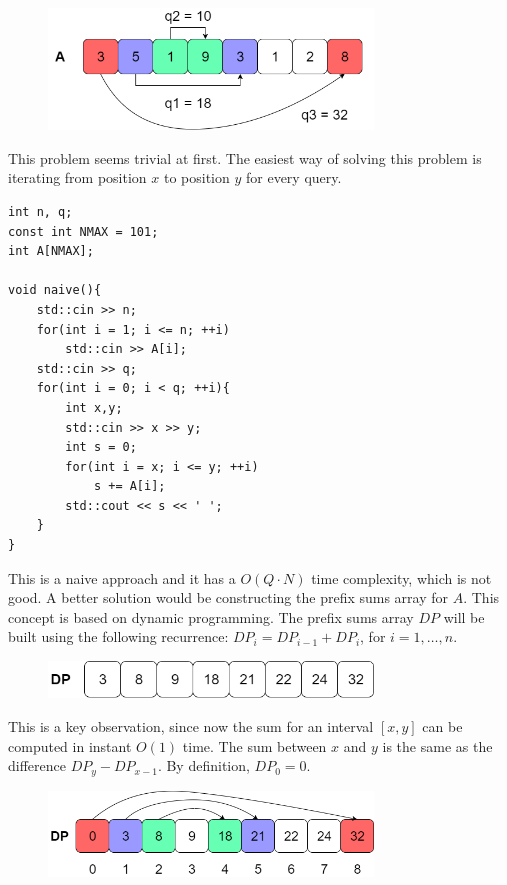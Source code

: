 \documentclass[letterpaper]{article}
\begin{document}
\begin{figure} [h!]
\centering
\includegraphics[width=0.77\textwidth]{pngOfDiagrams/prefixsum1.png}
\end{figure}

This problem seems trivial at first. The easiest way of solving this problem is iterating from position $x$ to position $y$ for every query.

\begin{lstlisting}
int n, q;
const int NMAX = 101;
int A[NMAX];

void naive(){
    std::cin >> n;
    for(int i = 1; i <= n; ++i)
        std::cin >> A[i];
    std::cin >> q;
    for(int i = 0; i < q; ++i){
        int x,y;
        std::cin >> x >> y;
        int s = 0;
        for(int i = x; i <= y; ++i)
            s += A[i];
        std::cout << s << ' ';
    }
}
\end{lstlisting}

This is a naive approach and it has a $O(Q \cdot N)$ time complexity, which is not good. A better solution would be constructing the prefix sums array for $A$. This concept is based on dynamic programming. The prefix sums array $DP$ will be built using the following recurrence: $DP_{i} = DP_{i - 1} + DP_{i}$, for $i = 1,\dots,n$.

\begin{figure} [h!]
\centering
\includegraphics[width=0.77\textwidth]{pngOfDiagrams/prefixsum2.png}
\end{figure}

This is a key observation, since now the sum for an interval $[x,y]$ can be computed in instant $O(1)$ time. The sum between $x$ and $y$ is the same as the difference $DP_{y} - DP_{x - 1}$. By definition, $DP_0 = 0$.

\begin{figure} [h!]
\centering
\includegraphics[width=0.77\textwidth]{pngOfDiagrams/prefixsum3.png}
\end{figure}
\end{document}
